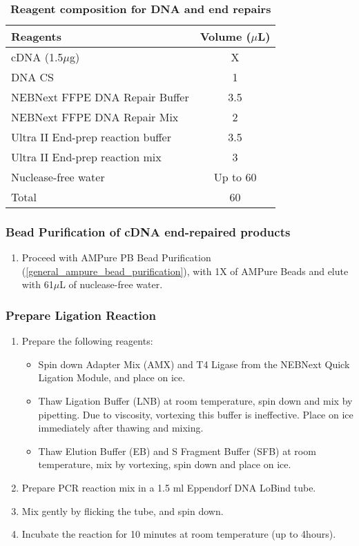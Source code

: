\vspace{1cm}
\begin{table}[h]
	\centering
	\caption[Repair DNA and Ends]%
	{\textbf{Reagent composition for DNA and end repairs}}
	\label{tab:ont_repair_dna_ends}
	\begin{tabularx}{0.8\textwidth}{lc}
		\toprule
		Reagents                          & Volume ($\mu$L) \\ \midrule
		cDNA (1.5$\mu$g)                  & X           \\
		DNA CS                            & 1           \\
		NEBNext FFPE DNA Repair Buffer    & 3.5         \\
		NEBNext FFPE DNA Repair Mix       & 2           \\
		Ultra II End-prep reaction buffer & 3.5         \\
		Ultra II End-prep reaction mix    & 3           \\
		Nuclease-free water               & Up to 60    \\
		Total                             & 60          \\ \bottomrule
	\end{tabularx}
\end{table}

\subsubsection{Bead Purification of cDNA end-repaired products}
\begin{enumerate}
	\item Proceed with AMPure PB Bead Purification (\cref{general_ampure_bead_purification}), with 1X of AMPure Beads and elute with 61$\mu$L of nuclease-free water.
\end{enumerate}

\subsubsection{Prepare Ligation Reaction}
\begin{enumerate}
	\item Prepare the following reagents:
	\begin{itemize}
		\item Spin down Adapter Mix (AMX) and T4 Ligase from the NEBNext Quick Ligation Module, and place on ice.
		\item Thaw Ligation Buffer (LNB) at room temperature, spin down and mix by pipetting. Due to viscosity, vortexing this buffer is ineffective. Place on ice immediately after thawing and mixing.
		\item Thaw Elution Buffer (EB) and S Fragment Buffer (SFB) at room temperature, mix by vortexing, spin down and place on ice.
	\end{itemize}
	\item Prepare PCR reaction mix in a 1.5 ml Eppendorf DNA LoBind tube.
	\item Mix gently by flicking the tube, and spin down.
	\item Incubate the reaction for 10 minutes at room temperature (up to 4hours).
\end{enumerate}

